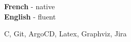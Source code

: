 \documentclass[10pt]{developercv} %
\begin{document}

\begin{minipage}[t]{0.5\textwidth}
	\vspace{-\baselineskip} %


	\textbf{French} - native\\
	\textbf{English} - fluent
\end{minipage}
\hfill
\begin{minipage}[t]{0.5\textwidth}
	\vspace{-\baselineskip} %


	{C, Git, ArgoCD, Latex, Graphviz, Jira}

\end{minipage}

\end{document}
